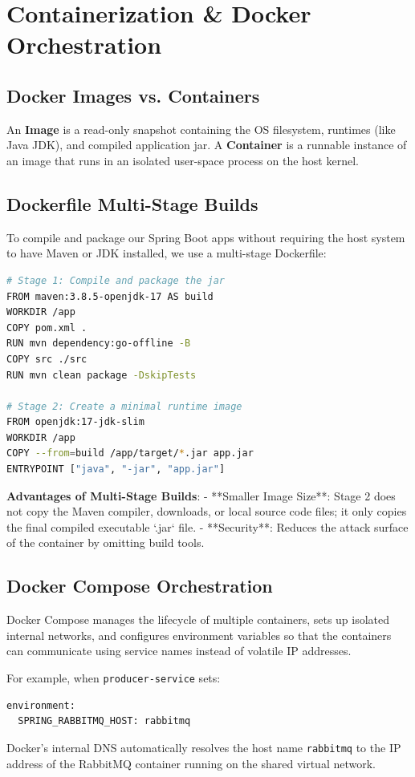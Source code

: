 \documentclass[11pt,a4paper]{article}
\begin{document}
\newpage
\section{Containerization \& Docker Orchestration}

\subsection{Docker Images vs. Containers}
An \textbf{Image} is a read-only snapshot containing the OS filesystem, runtimes (like Java JDK), and compiled application jar. A \textbf{Container} is a runnable instance of an image that runs in an isolated user-space process on the host kernel.

\subsection{Dockerfile Multi-Stage Builds}
To compile and package our Spring Boot apps without requiring the host system to have Maven or JDK installed, we use a multi-stage Dockerfile:

\begin{lstlisting}[language=bash]
# Stage 1: Compile and package the jar
FROM maven:3.8.5-openjdk-17 AS build
WORKDIR /app
COPY pom.xml .
RUN mvn dependency:go-offline -B
COPY src ./src
RUN mvn clean package -DskipTests

# Stage 2: Create a minimal runtime image
FROM openjdk:17-jdk-slim
WORKDIR /app
COPY --from=build /app/target/*.jar app.jar
ENTRYPOINT ["java", "-jar", "app.jar"]
\end{lstlisting}

\textbf{Advantages of Multi-Stage Builds}:
- **Smaller Image Size**: Stage 2 does not copy the Maven compiler, downloads, or local source code files; it only copies the final compiled executable `.jar` file.
- **Security**: Reduces the attack surface of the container by omitting build tools.

\subsection{Docker Compose Orchestration}
Docker Compose manages the lifecycle of multiple containers, sets up isolated internal networks, and configures environment variables so that the containers can communicate using service names instead of volatile IP addresses.

For example, when \texttt{producer-service} sets:
\begin{lstlisting}
environment:
  SPRING_RABBITMQ_HOST: rabbitmq
\end{lstlisting}
Docker's internal DNS automatically resolves the host name \texttt{rabbitmq} to the IP address of the RabbitMQ container running on the shared virtual network.
\end{document}
